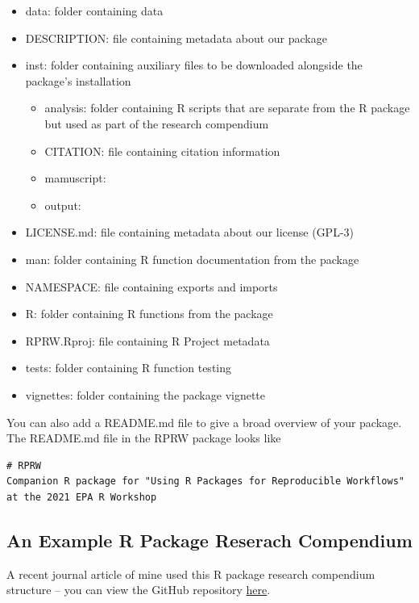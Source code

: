 \documentclass[
]{book}
\providecommand{\tightlist}{%
  \setlength{\itemsep}{0pt}\setlength{\parskip}{0pt}}
\begin{document}
\begin{itemize}
\tightlist
\item
  data: folder containing data
\item
  DESCRIPTION: file containing metadata about our package
\item
  inst: folder containing auxiliary files to be downloaded alongside the package's installation

  \begin{itemize}
  \tightlist
  \item
    analysis: folder containing R scripts that are separate from the R package but used as part of the research compendium
  \item
    CITATION: file containing citation information
  \item
    mamuscript:
  \item
    output:
  \end{itemize}
\item
  LICENSE.md: file containing metadata about our license (GPL-3)
\item
  man: folder containing R function documentation from the package
\item
  NAMESPACE: file containing exports and imports
\item
  R: folder containing R functions from the package
\item
  RPRW.Rproj: file containing R Project metadata
\item
  tests: folder containing R function testing
\item
  vignettes: folder containing the package vignette
\end{itemize}

You can also add a README.md file to give a broad overview of your package. The README.md file in the RPRW package looks like

\begin{verbatim}
# RPRW
Companion R package for "Using R Packages for Reproducible Workflows" at the 2021 EPA R Workshop
\end{verbatim}

\hypertarget{an-example-r-package-reserach-compendium}{%
\subsection{An Example R Package Reserach Compendium}\label{an-example-r-package-reserach-compendium}}

A recent journal article of mine used this R package research compendium structure -- you can view the GitHub repository \href{https://github.com/michaeldumelle/DumelleEtAl2021STLMM}{here}.
\end{document}
